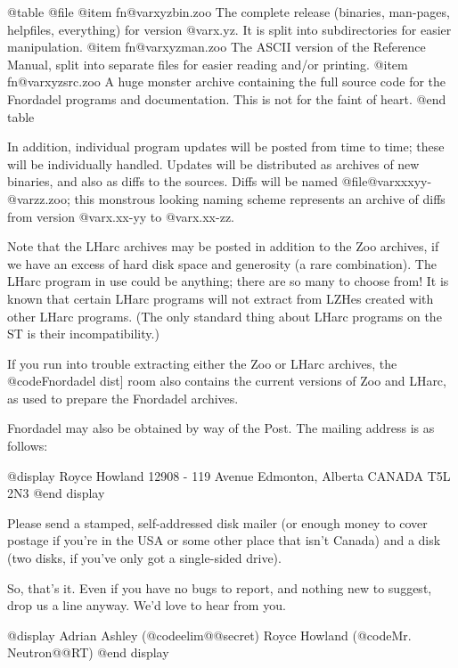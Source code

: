 @table @file
@item fn@var{xyz}bin.zoo
The complete release (binaries, man-pages, helpfiles,
everything) for version @var{x.yz}.  It is split into subdirectories for
easier manipulation.
@item fn@var{xyz}man.zoo
The ASCII version of the Reference Manual, split into separate files
for easier reading and/or printing.
@item fn@var{xyz}src.zoo
A huge monster archive containing the full source code for the Fnordadel
programs and documentation.  This is not for the faint of heart.
@end table

In addition, individual program updates will be posted from time to time;
these will be individually handled.  Updates will be distributed as archives
of new binaries, and also as diffs to the sources.  Diffs will be named
@file{@var{xxxyy}-@var{zz}.zoo}; this monstrous looking naming scheme
represents an archive of diffs from version @var{x.xx-yy} to @var{x.xx-zz}.

Note that the LHarc archives may be posted in addition to the Zoo archives,
if we have an excess of hard disk space and generosity (a rare combination).
The LHarc program in use could be anything; there are so many to choose from!
It is known that certain LHarc programs will not extract from LZHes
created with other LHarc programs.  (The only standard thing about
LHarc programs on the ST is their incompatibility.)

If you run into trouble extracting either the Zoo or LHarc archives, the
@code{Fnordadel dist]} room also contains the current versions of Zoo and
LHarc, as used to prepare the Fnordadel archives.

Fnordadel may also be obtained by way of the Post.  The mailing
address is as follows:

@display
Royce Howland
12908 - 119 Avenue
Edmonton, Alberta
CANADA  T5L 2N3
@end display

Please send a stamped, self-addressed disk mailer (or enough money
to cover postage if you're in the USA or some other place that isn't Canada)
and a disk (two disks, if you've only got a single-sided drive).

So, that's it.  Even if you have no bugs to report, and nothing new
to suggest, drop us a line anyway.  We'd love to hear from you.

@display
Adrian Ashley (@code{elim@@secret})
Royce Howland (@code{Mr. Neutron@@RT})
@end display
